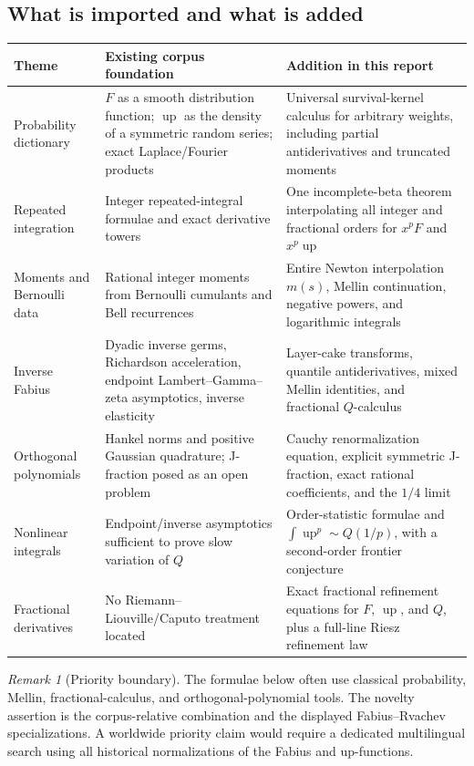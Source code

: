 \documentclass[11pt,oneside]{article}
\theoremstyle{definition}
\theoremstyle{remark}
\newtheorem{remark}[theorem]{Remark}
\newcommand{\Up}{\operatorname{up}}
\newcommand{\1}{\mathbf 1}
\begin{document}
\subsection{What is imported and what is added}

\begin{center}
\small
\begin{tabularx}{0.98\textwidth}{@{}p{}X X@{}}
\toprule
Theme & Existing corpus foundation & Addition in this report \\
\midrule
Probability dictionary
& \(F\) as a smooth distribution function; \(\Up\) as the density of a
symmetric random series; exact Laplace/Fourier products
& Universal survival-kernel calculus for arbitrary weights, including partial
antiderivatives and truncated moments \\
Repeated integration
& Integer repeated-integral formulae and exact derivative towers
& One incomplete-beta theorem interpolating all integer and fractional orders
for \(x^pF\) and \(x^p\Up\) \\
Moments and Bernoulli data
& Rational integer moments from Bernoulli cumulants and Bell recurrences
& Entire Newton interpolation \(m(s)\), Mellin continuation, negative powers,
and logarithmic integrals \\
Inverse Fabius
& Dyadic inverse germs, Richardson acceleration, endpoint Lambert--Gamma--zeta
asymptotics, inverse elasticity
& Layer-cake transforms, quantile antiderivatives, mixed Mellin identities, and
fractional \(Q\)-calculus \\
Orthogonal polynomials
& Hankel norms and positive Gaussian quadrature; J-fraction posed as an open
problem
& Cauchy renormalization equation, explicit symmetric J-fraction, exact rational
coefficients, and the \(1/4\) limit \\
Nonlinear integrals
& Endpoint/inverse asymptotics sufficient to prove slow variation of \(Q\)
& Order-statistic formulae and \(\int\Up^p\sim Q(1/p)\), with a second-order
frontier conjecture \\
Fractional derivatives
& No Riemann--Liouville/Caputo treatment located
& Exact fractional refinement equations for \(F\), \(\Up\), and \(Q\), plus a
full-line Riesz refinement law \\
\bottomrule
\end{tabularx}
\end{center}

\begin{remark}[Priority boundary]
The formulae below often use classical probability, Mellin, fractional-calculus,
and orthogonal-polynomial tools.  The novelty assertion is the corpus-relative
combination and the displayed Fabius--Rvachev specializations.  A worldwide
priority claim would require a dedicated multilingual search using all historical
normalizations of the Fabius and up-functions.
\end{remark}
\end{document}
